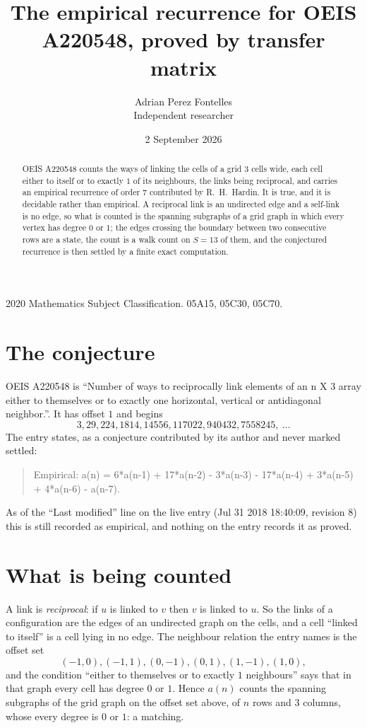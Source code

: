 \documentclass[11pt,a4paper]{article}
\title{The empirical recurrence for OEIS A220548, proved by transfer matrix}
\author{Adrian Perez Fontelles\\ \small Independent researcher}
\date{2 September 2026}
\theoremstyle{plain}
\theoremstyle{definition}
\begin{document}
\maketitle

\begin{abstract}
OEIS A220548 counts the ways of linking the cells of a grid $3$ cells wide, each cell either to
itself or to exactly $1$ of its neighbours, the links being reciprocal, and carries an
empirical recurrence of order $7$ contributed by R.~H.~Hardin. It is true, and it is
decidable rather than empirical. A reciprocal link is an undirected edge and a self-link is
no edge, so what is counted is the spanning subgraphs of a grid graph in which every vertex
has degree $0$ or $1$; the edges crossing the boundary between two consecutive rows are a
state, the count is a walk count on $S=13$ of them, and the conjectured recurrence is then
settled by a finite exact computation.
\end{abstract}

\noindent\small 2020 Mathematics Subject Classification. 05A15, 05C30, 05C70.\normalsize

\section{The conjecture}

OEIS A220548 is ``Number of ways to reciprocally link elements of an n X 3 array either to themselves or to exactly one horizontal, vertical or antidiagonal neighbor.''. It has offset $1$ and begins
\[
3, 29, 224, 1814, 14556, 117022, 940432, 7558245,\ \dots
\]
The entry states, as a conjecture contributed by its author and never marked settled:
\begin{quote}
Empirical: a(n) = 6*a(n-1) + 17*a(n-2) - 3*a(n-3) - 17*a(n-4) + 3*a(n-5) + 4*a(n-6) - a(n-7).
\end{quote}
As of the ``Last modified'' line on the live entry (Jul 31 2018 18:40:09, revision 8) this is still
recorded as empirical, and nothing on the entry records it as proved.

\section{What is being counted}

A link is \emph{reciprocal}: if $u$ is linked to $v$ then $v$ is linked to $u$. So the links
of a configuration are the edges of an undirected graph on the cells, and a cell ``linked to
itself'' is a cell lying in no edge. The neighbour relation the entry names is the offset set
\[
(-1,0), (-1,1), (0,-1), (0,1), (1,-1), (1,0),
\]
and the condition ``either to themselves or to exactly $1$ neighbours'' says that in that
graph every cell has degree $0$ or $1$. Hence $a(n)$ counts the spanning subgraphs of the
grid graph on the offset set above, of $n$ rows and $3$ columns,
whose every degree is $0$ or $1$: a matching.
\end{document}
